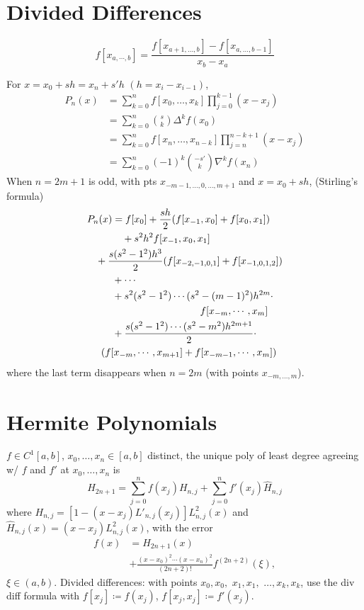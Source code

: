 \documentclass[9pt]{memoir}
\begin{document}
\begin{multicols*}{3}
    \section{Divided Differences}
    $$f[x_{a,\cdots,b}] = \frac{f[x_{a+1,\dots,b}] - f[x_{a,\dots,b-1}]}{x_b-x_a}$$

    For $x=x_0+sh = x_n + s'h$ $(h=x_i-x_{i-1})$,
    \begin{align*}
        P_n(x) & = \sum_{k=0}^n f[x_0,\dots,x_k]\prod_{j=0}^{k-1}(x-x_j)
        \\&= \sum_{k=0}^n \binom s k \Delta^k f(x_0)
        \\&= \sum_{k=0}^n f[x_n,\dots,x_{n-k}]\prod_{j=n}^{n-k+1}(x-x_j)
        \\&= \sum_{k=0}^n (-1)^k \binom {-s'} k \nabla^k f(x_n)
    \end{align*}
    When $n=2m+1$ is odd, with pts $x_{-m-1, \dots, 0,\dots,m+1}$ and $x=x_0+sh$, (Stirling's formula)
    \begin{align*}
        P_n(x) & = f[x_0] + \frac{sh}2 (f[x_{-1},x_0]+f[x_0,x_1])
        \\&\quad + s^2h^2 f[x_{-1},x_0,x_1]
        \\ &\mkern-30mu +\frac{s(s^2-1^2)h^3}{2} (f[x_{-2,-1,0,1}]+f[x_{-1,0,1,2}])
        \\ &+\cdots
        \\ &+ s^2(s^2-1^2)\cdots(s^2-(m-1)^2)h^{2m} \cdot
        \\ & \mkern160mu f[x_{-m},\cdots,x_m]
        \\ &+ \frac{s(s^2-1^2)\cdots (s^2-m^2)h^{2m+1}} 2 \cdot
        \\ &  \mkern-20mu (f[x_{-m},\cdots,x_{m+1}]+f[x_{-m-1},\cdots,x_m])
    \end{align*}
    where the last term disappears when $n=2m$ (with points $x_{-m,\dots,m}$).

    \section{Hermite Polynomials}
    $f\in C^1[a,b]$, $x_0,\dots,x_n\in [a,b]$ distinct, the unique poly of least degree agreeing w/ $f$ and $f'$ at $x_0,\dots,x_n$ is
    $$H_{2n+1} = \sum_{j=0}^n f(x_j)H_{n,j} + \sum_{j=0}^n f'(x_j)\hat H_{n,j}$$
    where $H_{n,j} = [1-(x-x_j)L'_{n,j}(x_j)]L_{n,j}^2(x)$ and $\hat H_{n,j}(x) = (x-x_j)L^2_{n,j}(x)$, with the error
    \begin{align*}
        f(x) & = H_{2n+1}(x)
        \\ &+ \frac{(x-x_0)^2\cdots(x-x_n)^2}{(2n+2)!}f^{(2n+2)}(\xi),
    \end{align*}
    $\xi\in(a,b)$. \nl
    \s Divided differences: with points $x_0,x_0,$ $x_1,x_1,$ $\dots,x_k,x_k$, use the div diff formula with $f[x_j]\coloneqq f(x_j)$, $f[x_j,x_j] \coloneqq f'(x_j)$.


\end{multicols*}
\end{document}
